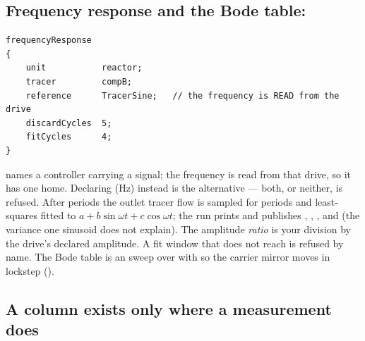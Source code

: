 \documentclass[11pt,a4paper]{article}
\begin{document}
\subsection{Frequency response and the Bode table: }\label{sec:ctrl-freq}

\begin{lstlisting}[language=dict]
frequencyResponse
{
    unit           reactor;
    tracer         compB;
    reference      TracerSine;   // the frequency is READ from the drive
    discardCycles  5;
    fitCycles      4;
}
\end{lstlisting}

 names a  controller carrying a
 signal; the frequency is read from that drive, so it
has one home.  Declaring  (Hz) instead is the
alternative --- both, or neither, is refused.  After
 periods the outlet tracer flow is sampled for
 periods and least-squares fitted to
$a + b\sin\omega t + c\cos\omega t$; the run prints
 and publishes ,
, ,
 and  (the variance
one sinusoid does not explain).  The amplitude \emph{ratio} is your
division by the drive's declared amplitude.  A fit window that
 does not reach is refused by name.  The Bode table is an
 sweep over  with
 so the carrier
mirror moves in lockstep ().

\subsection{A column exists only where a measurement does}\label{sec:ctrl-pv-columns}
\end{document}
